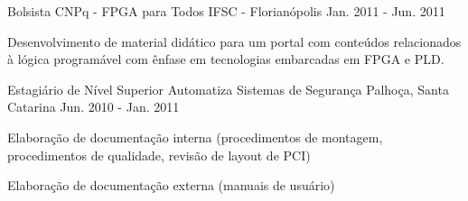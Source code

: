 \begin{cventries}
  \cventry
    {Bolsista} %
    {CNPq - FPGA para Todos}
    {IFSC - Florianópolis} %
    {Jan. 2011 - Jun. 2011} %
    {
      \begin{cvitems} %
        \item {Desenvolvimento de material didático para um portal com conteúdos relacionados à lógica programável com ênfase em tecnologias embarcadas em FPGA e PLD.}
      \end{cvitems}
    }
  \cventry
    {Estagiário de Nível Superior} %
    {Automatiza Sistemas de Segurança} %
    {Palhoça, Santa Catarina} %
    {Jun. 2010 - Jan. 2011} %
    {
      \begin{cvitems} %
      \item {Elaboração de documentação interna (procedimentos de montagem, procedimentos de qualidade, revisão de layout de PCI)}
      \item {Elaboração de documentação externa (manuais de usuário)}
      \end{cvitems}
    }


\end{cventries}
